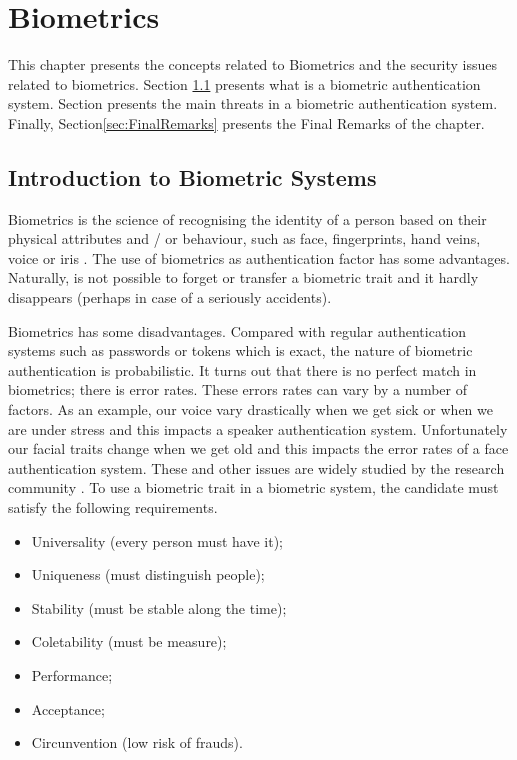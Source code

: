 \chapter{Biometrics}
\label{chap:Biometrics}

This chapter presents the concepts related to Biometrics and the security issues related to biometrics. Section \ref{sec:IntroBiome} presents what is a biometric authentication system. Section \label{sec:AttacksBiometric} presents the main threats in a biometric authentication system. Finally, Section\ref{sec:FinalRemarks} presents the Final Remarks of the chapter.

\section{Introduction to Biometric Systems}
\label{sec:IntroBiome}

Biometrics is the science of recognising the identity of a person based on their physical attributes and / or behaviour, such as face, fingerprints, hand veins, voice or iris \cite{li2011handbook}. The use of biometrics as authentication factor has some advantages. Naturally, is not possible to forget or transfer a biometric trait and it hardly disappears (perhaps in case of a seriously accidents). 

Biometrics has some disadvantages. Compared with regular authentication systems such as passwords or tokens which is exact, the nature of biometric authentication is probabilistic. It turns out that there is no perfect match in biometrics; there is error rates. These errors rates can vary by a number of factors. As an example, our voice vary drastically  when we get sick or when we are under stress and this impacts a speaker authentication system. Unfortunately our facial traits change when we get old and this impacts the error rates of a face authentication system. These and other issues are widely studied by the research community \cite{flynn2008handbook}. To use a biometric trait in a biometric system, the candidate must satisfy the following requirements.

\begin{itemize}
        \item Universality (every person must have it);
        \item Uniqueness (must distinguish people);
        \item Stability (must be stable along the time);
        \item Coletability (must be measure);
        \item Performance;
        \item Acceptance;
        \item Circunvention (low risk of frauds).
\end{itemize}

